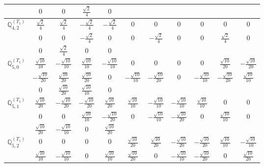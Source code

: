 \documentclass[fleqn,10pt,landscape]{article}
\begin{document}
\begin{itemize}
{\begin{center}
\begin{longtable}{ccccccccccc}
& $ 0 $ & $ 0 $ & $ \frac{\sqrt{2}}{4} $ & $ 0 $ & $  $ & $  $ & $  $ & $  $ & $  $ & $  $ \\ \hline
$\mathbb{Q}_{4,2}^{(T_{1})}$ & $ \frac{\sqrt{2}}{4} $ & $ \frac{\sqrt{2}}{4} $ & $ - \frac{\sqrt{2}}{4} $ & $ - \frac{\sqrt{2}}{4} $ & $ 0 $ & $ 0 $ & $ 0 $ & $ 0 $ & $ 0 $ & $ 0 $ \\
& $ 0 $ & $ 0 $ & $ - \frac{\sqrt{2}}{4} $ & $ 0 $ & $ 0 $ & $ - \frac{\sqrt{2}}{4} $ & $ 0 $ & $ 0 $ & $ \frac{\sqrt{2}}{4} $ & $ 0 $ \\
& $ 0 $ & $ \frac{\sqrt{2}}{4} $ & $ 0 $ & $ 0 $ & $  $ & $  $ & $  $ & $  $ & $  $ & $  $ \\ \hline
$\mathbb{Q}_{5,0}^{(T_{1})}$ & $ \frac{\sqrt{10}}{10} $ & $ - \frac{\sqrt{10}}{10} $ & $ \frac{\sqrt{10}}{10} $ & $ - \frac{\sqrt{10}}{10} $ & $ 0 $ & $ 0 $ & $ 0 $ & $ 0 $ & $ \frac{\sqrt{10}}{20} $ & $ - \frac{\sqrt{10}}{20} $ \\
& $ - \frac{\sqrt{10}}{20} $ & $ \frac{\sqrt{10}}{20} $ & $ \frac{\sqrt{10}}{20} $ & $ 0 $ & $ - \frac{\sqrt{10}}{10} $ & $ - \frac{\sqrt{10}}{20} $ & $ 0 $ & $ - \frac{\sqrt{10}}{10} $ & $ - \frac{\sqrt{10}}{20} $ & $ \frac{\sqrt{10}}{10} $ \\
& $ 0 $ & $ \frac{\sqrt{10}}{20} $ & $ \frac{\sqrt{10}}{10} $ & $ 0 $ & $  $ & $  $ & $  $ & $  $ & $  $ & $  $ \\ \hline
$\mathbb{Q}_{5,1}^{(T_{1})}$ & $ \frac{\sqrt{10}}{20} $ & $ - \frac{\sqrt{10}}{20} $ & $ - \frac{\sqrt{10}}{20} $ & $ \frac{\sqrt{10}}{20} $ & $ \frac{\sqrt{10}}{10} $ & $ - \frac{\sqrt{10}}{10} $ & $ - \frac{\sqrt{10}}{10} $ & $ \frac{\sqrt{10}}{10} $ & $ 0 $ & $ 0 $ \\
& $ 0 $ & $ 0 $ & $ \frac{\sqrt{10}}{10} $ & $ - \frac{\sqrt{10}}{20} $ & $ 0 $ & $ - \frac{\sqrt{10}}{10} $ & $ - \frac{\sqrt{10}}{20} $ & $ 0 $ & $ \frac{\sqrt{10}}{10} $ & $ 0 $ \\
& $ \frac{\sqrt{10}}{20} $ & $ - \frac{\sqrt{10}}{10} $ & $ 0 $ & $ \frac{\sqrt{10}}{20} $ & $  $ & $  $ & $  $ & $  $ & $  $ & $  $ \\ \hline
$\mathbb{Q}_{5,2}^{(T_{1})}$ & $ 0 $ & $ 0 $ & $ 0 $ & $ 0 $ & $ \frac{\sqrt{10}}{20} $ & $ \frac{\sqrt{10}}{20} $ & $ - \frac{\sqrt{10}}{20} $ & $ - \frac{\sqrt{10}}{20} $ & $ \frac{\sqrt{10}}{10} $ & $ - \frac{\sqrt{10}}{10} $ \\
& $ \frac{\sqrt{10}}{10} $ & $ - \frac{\sqrt{10}}{10} $ & $ 0 $ & $ \frac{\sqrt{10}}{10} $ & $ \frac{\sqrt{10}}{20} $ & $ 0 $ & $ - \frac{\sqrt{10}}{10} $ & $ - \frac{\sqrt{10}}{20} $ & $ 0 $ & $ \frac{\sqrt{10}}{20} $ \\

\end{longtable}
\end{center}}
\end{itemize}
\end{document}
